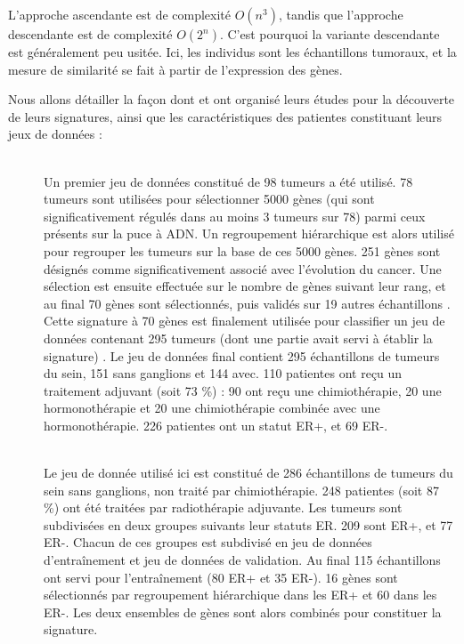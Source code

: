			L'approche ascendante est de complexité $O(n^{3})$, tandis que l'approche descendante est de complexité $O(2^{n})$.
			C'est pourquoi la variante descendante est généralement peu usitée.
			Ici, les individus sont les échantillons tumoraux, et la mesure de similarité se fait à partir de l'expression des gènes.

			Nous allons détailler la façon dont \citeauthor{vandevijver2002} et \citeauthor{Wang2005} ont organisé leurs études pour la découverte de leurs signatures, ainsi que les caractéristiques des patientes constituant leurs jeux de données :
			\begin{description}
				\item [\citet{vandevijver2002}] \hfill \\
					Un premier jeu de données constitué de 98 tumeurs a été utilisé.
					78 tumeurs sont utilisées pour sélectionner 5000 gènes (qui sont significativement régulés dans au moins 3 tumeurs sur 78) parmi ceux présents sur la puce à \acs{ADN}.
					Un regroupement hiérarchique est alors utilisé pour regrouper les tumeurs sur la base de ces 5000 gènes.
					251 gènes sont désignés comme significativement associé avec l'évolution du cancer.
					Une sélection est ensuite effectuée sur le nombre de gènes suivant leur rang, et au final 70 gènes sont sélectionnés, puis validés sur 19 autres échantillons \citep{vantveer2002}.
					Cette signature à 70 gènes est finalement utilisée pour classifier un jeu de données contenant 295 tumeurs (dont une partie avait servi à établir la signature) \citep{vandevijver2002}.
					Le jeu de données final contient 295 échantillons de tumeurs du sein, 151 sans ganglions et 144 avec.
					110 patientes ont reçu un traitement adjuvant (soit 73 \%) : 90 ont reçu une chimiothérapie, 20 une hormonothérapie et 20 une chimiothérapie combinée avec une hormonothérapie.
					226 patientes ont un statut \acs{ER+}, et 69 \acs{ER-}.
				\item [\citet{Wang2005}]                  \hfill \\
					Le jeu de donnée utilisé ici est constitué de 286 échantillons de tumeurs du sein sans ganglions, non traité par chimiothérapie.
					248 patientes (soit 87 \%) ont été traitées par radiothérapie adjuvante.
					Les tumeurs sont subdivisées en deux groupes suivants leur statuts \acs{ER}.
					209 sont \acs{ER+}, et 77 \acs{ER-}.
					Chacun de ces groupes est subdivisé en jeu de données d'entraînement et jeu de données de validation.
					Au final 115 échantillons ont servi pour l'entraînement (80 \acs{ER+} et 35 \acs{ER-}).
					16 gènes sont sélectionnés par regroupement hiérarchique dans les \acs{ER+} et 60 dans les \acs{ER-}.
					Les deux ensembles de gènes sont alors combinés pour constituer la signature.
			\end{description}

